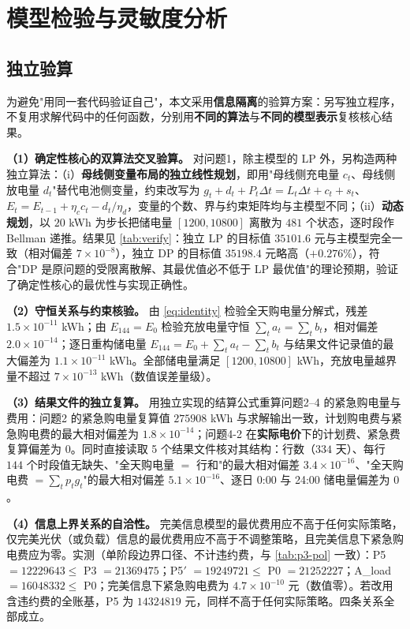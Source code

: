 \section{模型检验与灵敏度分析}
\label{sec:validation}

\subsection{独立验算}

为避免"用同一套代码验证自己"，本文采用\textbf{信息隔离}的验算方案：另写独立程序，不复用求解代码中的任何函数，分别用\textbf{不同的算法}与\textbf{不同的模型表示}复核核心结果。

\textbf{（1）确定性核心的双算法交叉验算。} 对问题1，除主模型的 LP 外，另构造两种独立算法：（i）\textbf{母线侧变量布局的独立线性规划}，即用"母线侧充电量 $c_t$、母线侧放电量 $d_t$"替代电池侧变量，约束改写为 $g_t+d_t+P_t\Delta t=L_t\Delta t+c_t+s_t$、$E_t=E_{t-1}+\eta_cc_t-d_t/\eta_d$，变量的个数、界与约束矩阵均与主模型不同；（ii）\textbf{动态规划}，以 $20$ \si{kWh} 为步长把储电量 $[1200,10800]$ 离散为 $481$ 个状态，逐时段作 Bellman 递推。结果见 \cref{tab:verify}：独立 LP 的目标值 $35101.6$ 元与主模型完全一致（相对偏差 $7\times10^{-8}$），独立 DP 的目标值 $35198.4$ 元略高（$+0.276\%$），符合"DP 是原问题的受限离散解、其最优值必不低于 LP 最优值"的理论预期，验证了确定性核心的最优性与实现正确性。

\textbf{（2）守恒关系与约束核验。} 由 \cref{eq:identity} 检验全天购电量分解式，残差 $1.5\times10^{-11}$ \si{kWh}；由 $E_{144}=E_0$ 检验充放电量守恒 $\sum_t a_t=\sum_t b_t$，相对偏差 $2.0\times10^{-14}$；逐日重构储电量 $E_{144}=E_0+\sum_t a_t-\sum_t b_t$ 与结果文件记录值的最大偏差为 $1.1\times10^{-11}$ \si{kWh}。全部储电量满足 $[1200,10800]$ \si{kWh}，充放电量越界量不超过 $7\times10^{-13}$ \si{kWh}（数值误差量级）。

\textbf{（3）结果文件的独立复算。} 用独立实现的结算公式重算问题2--4 的紧急购电量与费用：问题2 的紧急购电量复算值 $275908$ \si{kWh} 与求解输出一致，计划购电费与紧急购电费的最大相对偏差为 $1.8\times10^{-14}$；问题4-2 在\textbf{实际电价}下的计划费、紧急费复算偏差为 $0$。同时直接读取 5 个结果文件核对其结构：行数（$334$ 天）、每行 $144$ 个时段值无缺失、"全天购电量 $=$ 行和"的最大相对偏差 $3.4\times10^{-16}$、"全天购电费 $=\sum_t p_tg_t$"的最大相对偏差 $5.1\times10^{-16}$、逐日 0:00 与 24:00 储电量偏差为 $0$。

\textbf{（4）信息上界关系的自洽性。} 完美信息模型的最优费用应不高于任何实际策略，仅完美光伏（或负载）信息的最优费用应不高于不调整策略，且完美信息下紧急购电费应为零。实测（单阶段边界口径、不计违约费，与 \cref{tab:p3-pol} 一致）：P5 $=12229643\le$ P3 $=21369475$；P5$\prime$ $=19249721\le$ P0 $=21252227$；A\_load $=16048332\le$ P0；完美信息下紧急购电费为 $4.7\times10^{-10}$ 元（数值零）。若改用含违约费的全账基，P5 为 $14324819$ 元，同样不高于任何实际策略。四条关系全部成立。

